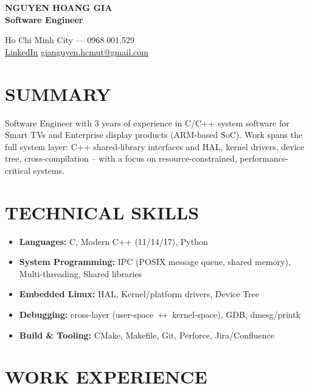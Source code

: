 \documentclass[a4paper,10pt]{article}
\begin{document}
\pagestyle{empty}

\begin{minipage}[t]{0.55\textwidth}
    {\LARGE \textbf{NGUYEN HOANG GIA}} \\[5pt]
    {\large \textbf{Software Engineer}}
\end{minipage}%
\begin{minipage}[t]{0.45\textwidth}
    \raggedleft
    \vspace{2pt}
    Ho Chi Minh City --- 0968.001.529 \\
    \href{https://www.linkedin.com/in/gia-nguyen-6a007b294/}{LinkedIn} \textbar{} \href{mailto:gianguyen.hcmut@gmail.com}{gianguyen.hcmut@gmail.com}
\end{minipage}

\vspace{4pt}

\section*{SUMMARY}
Software Engineer with 3 years of experience in C/C++ system software for Smart TVs and Enterprise display products (ARM-based SoC). 
Work spans the full system layer: C++ shared-library interfaces and HAL, kernel drivers, device tree, cross-compilation -- with a focus on 
resource-constrained, performance-critical systems.

\section*{TECHNICAL SKILLS}
\begin{itemize}
    \item \textbf{Languages:} C, Modern C++ (11/14/17), Python
    \item \textbf{System Programming:} IPC (POSIX message queue, shared memory),
    Multi-threading, Shared libraries
    \item \textbf{Embedded Linux:} HAL, Kernel/platform drivers, Device Tree
    \item \textbf{Debugging:} cross-layer (user-space $\leftrightarrow$ kernel-space), GDB, dmesg/printk
    \item \textbf{Build \& Tooling:} CMake, Makefile, Git, Perforce, Jira/Confluence
\end{itemize}

\section*{WORK EXPERIENCE}
\end{document}
